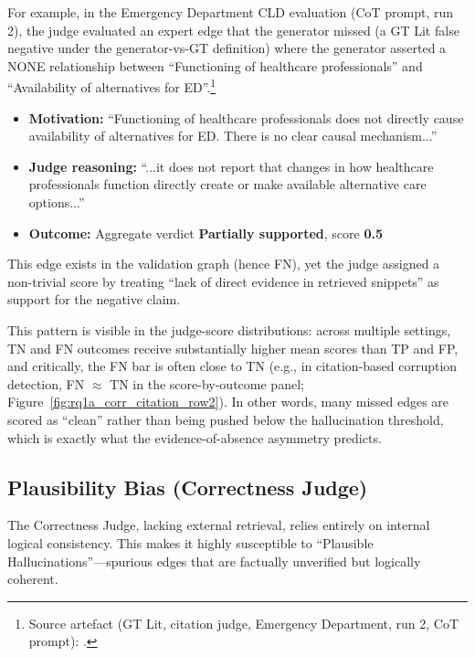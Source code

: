 For example, in the Emergency Department CLD evaluation (CoT prompt, run 2), the judge evaluated an expert edge that the generator missed (a GT Lit false negative under the generator-vs-GT definition) where the generator asserted a NONE relationship between ``Functioning of healthcare professionals'' and ``Availability of alternatives for ED''.\footnote{Source artefact (GT Lit, citation judge, Emergency Department, run 2, CoT prompt): .}%
\begin{itemize}[noitemsep]
    \item \textbf{Motivation:} ``Functioning of healthcare professionals does not directly cause availability of alternatives for ED. There is no clear causal mechanism...''
    \item \textbf{Judge reasoning:} ``...it does not report that changes in how healthcare professionals function directly create or make available alternative care options...''
    \item \textbf{Outcome:} Aggregate verdict \textbf{Partially supported}, score \textbf{0.5}
\end{itemize}

This edge exists in the validation graph (hence FN), yet the judge assigned a non-trivial score by treating ``lack of direct evidence in retrieved snippets'' as support for the negative claim.

This pattern is visible in the judge-score distributions: across multiple settings, TN and FN outcomes receive substantially higher mean scores than TP and FP, and critically, the FN bar is often close to TN (e.g., in citation-based corruption detection, FN $\approx$ TN in the score-by-outcome panel; Figure~\ref{fig:rq1a_corr_citation_row2}). In other words, many missed edges are scored as ``clean'' rather than being pushed below the hallucination threshold, which is exactly what the evidence-of-absence asymmetry predicts.

\subsection{Plausibility Bias (Correctness Judge)}

The Correctness Judge, lacking external retrieval, relies entirely on internal logical consistency. This makes it highly susceptible to ``Plausible Hallucinations''---spurious edges that are factually unverified but logically coherent.

